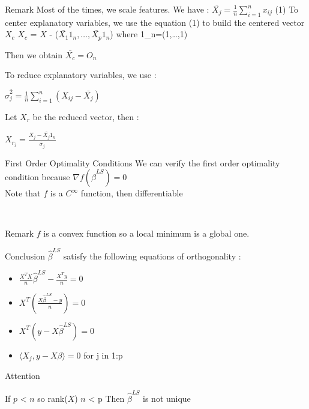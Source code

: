 \documentclass[unknownkeysallowed]{beamer}
\begin{document}
\begin{block}{Remark}
Most of the times, we scale features.
\newline
We have : $\bar{X_{j}}=\frac{1}{n} \sum\limits_{i=1}^{n} x_{ij}$ (1)
\newline
 To center explanatory variables, we use the equation (1) to build the centered vector $X_{c}$
\newline
$X_{c}$ =  $X$ - ($\bar{X_{1}}1_n,\dots,\bar{X_{p}}1_n$) where 1_n=(1,\dots,1)

Then we obtain $\bar{X_{c}}=O_n$

To reduce explanatory variables, we use :
\newline
\begin{center}
$\hat\sigma_{j}^2=\frac{1}{n} \sum\limits_{i=1}^{n} (X_{ij}-\bar{X_{j}})$
\end{center}
Let $X_r$ be the reduced vector, then :
\newline
\begin{center}
$X_{r_{j}}=\frac{X_{j}-\bar{X_{j}}1_n}{\hat\sigma_{j}}$
\end{center}

\end{block}


\begin{frame}
\begin{alertblock}{First Order Optimality Conditions}
We can verify the first order optimality condition because $\nabla{f(\hat\beta^{LS})}=0$
\\
Note that $f$ is a $C^{\infty}$ function, then differentiable

\end{alertblock}

\\\begin{block}{Remark}
$f$ is a convex function so a local minimum is a global one.
\end{block}

\begin{block}{Conclusion}
$\hat\beta^{LS}$ satisfy the following equations of orthogonality :
\begin{itemize}
        \item $\frac{X^TX}{n}\hat\beta^{LS}-\frac{X^Ty}{n}=0$
        \item \iff $X^T(\frac{X\hat\beta^{LS}-y}{n})=0$
        \item \iff $X^T(y-X\hat\beta^{LS})=0$
        \item \iff $\langle X_{j},y-X\beta\rangle=0$ for j in 1:p
    \end{itemize}


\end{block}

\newpage

\begin{block}{Attention}

If $p$ < $n$ so rank($X$) \leq $n$ < p Then $\hat\beta^{LS}$ is not unique

\end{block}


\end{frame}
\end{document}
